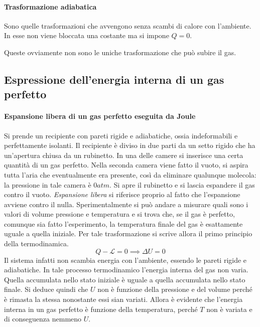 \documentclass[10pt,a4paper]{book}
\begin{document}
\paragraph{Trasformazione adiabatica} Sono quelle trasformazioni che avvengono senza scambi di calore con l'ambiente. In esse non viene bloccata una costante ma si impone $Q=0$.

Queste ovviamente non sono le uniche trasformazione che può subire il gas.

\subsection{Espressione dell'energia interna di un gas perfetto}

\paragraph{Espansione libera di un gas perfetto eseguita da Joule} Si prende un recipiente con pareti rigide e adiabatiche, ossia indeformabili e perfettamente isolanti. Il recipiente è diviso in due parti da un setto rigido che ha un'apertura chiusa da un rubinetto. In una delle camere si inserisce una certa quantità di un gas perfetto.
Nella seconda camera viene fatto il vuoto, si aspira tutta l'aria che eventualmente era presente, così da eliminare qualunque molecola: la pressione in tale camera è $0 atm$. Si apre il rubinetto e si lascia espandere il gas contro il vuoto. \emph{Espansione libera} si riferisce proprio al fatto che l'espansione avviene contro il nulla. Sperimentalmente si può andare a misurare quali sono i valori di volume pressione e temperatura e si trova che, se il gas è perfetto, comunque sia fatto l'esperimento, la temperatura finale del gas è esattamente uguale a quella iniziale. Per tale trasformazione si scrive allora il primo principio della termodinamica.
\[
	Q-\mathcal{L}=0 \implies \Delta U=0
\]
Il sistema infatti non scambia energia con l'ambiente, essendo le pareti rigide e adiabatiche. In tale processo termodinamico l'energia interna del gas non varia. Quella accumulata nello stato iniziale è uguale a quella accumulata nello stato finale. Si deduce quindi che $U$ non è funzione della pressione e del volume perché è rimasta la stessa nonostante essi sian variati. Allora è evidente che l'energia interna in un gas perfetto è funzione della temperatura, perché $T$ non è variata e di conseguenza nemmeno $U$.
\end{document}
